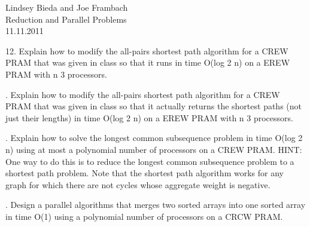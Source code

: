 \documentclass[10pt]{article}
\begin{document}
	\begin{flushright}
	Lindsey Bieda and Joe Frambach\\
	Reduction and Parallel Problems\\
	11.11.2011
	\end{flushright}

12. Explain how to modify the all-pairs shortest path algorithm for a CREW PRAM that was given in
class so that it runs in time O(log
2
n) on a EREW PRAM with n
3
processors.

. Explain how to modify the all-pairs shortest path algorithm for a CREW PRAM that was given in
class so that it actually returns the shortest paths (not just their lengths) in time O(log
2
n) on a EREW
PRAM with n
3
processors.

. Explain how to solve the longest common subsequence problem in time O(log
2
n) using at most a
polynomial number of processors on a CREW PRAM.
HINT: One way to do this is to reduce the longest common subsequence problem to a shortest path
problem. Note that the shortest path algorithm works for any graph for which there are not cycles
whose aggregate weight is negative.

. Design a parallel algorithms that merges two sorted arrays into one sorted array in time O(1) using a
polynomial number of processors on a CRCW PRAM.
\end{document}
